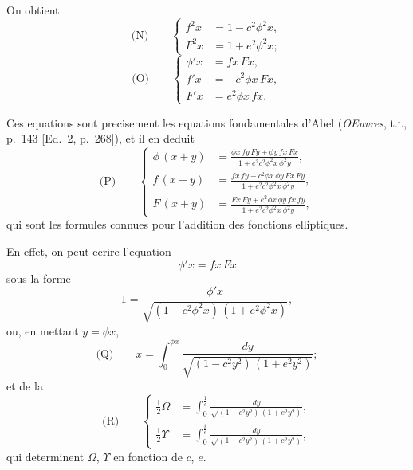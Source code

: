 \documentclass[11pt,a4paper]{book}
\begin{document}
On obtient
\begin{equation*}
\text{(N)}\qquad
\left\{
\begin{aligned}
f^2x &= 1 - c^2 \phi^2 x,\\
F^2x &= 1 + e^2 \phi^2 x;
\end{aligned}
\right.
\end{equation*}
\begin{equation*}
\text{(O)}\qquad
\left\{
\begin{aligned}
\phi' x &= fx\, Fx,\\
f' x &= -c^2 \phi x\, Fx,\\
F' x &= e^2 \phi x\, fx.
\end{aligned}
\right.
\end{equation*}

Ces equations sont precisement les equations fondamentales d'Abel (\textit{OEuvres}, t.\textsc{i}., p.~143
[Ed.~2, p.~268]), et il en deduit
\begin{equation*}
\text{(P)}\qquad
\left\{
\begin{aligned}
\phi\, (x+y) &= \frac{\phi x\, fy\, Fy + \phi y\, fx\, Fx}{1 + e^2 c^2 \phi^2 x\, \phi^2 y},\\
f\, (x+y) &= \frac{fx\, fy - c^2 \phi x\, \phi y\, Fx\, Fy}{1 + e^2 c^2 \phi^2 x\, \phi^2 y},\\
F\, (x+y) &= \frac{Fx\, Fy + e^2 \phi x\, \phi y\, fx\, fy}{1 + e^2 c^2 \phi^2 x\, \phi^2 y},
\end{aligned}
\right.
\end{equation*}
qui sont les formules connues pour l'addition des fonctions elliptiques.

En effet, on peut ecrire l'equation
\[\phi' x = fx\, Fx\]
sous la forme
\[1 = \frac{\phi' x}{\sqrt{(1 - c^2 \phi^2 x)\, (1 + e^2 \phi^2 x)}},\]
ou, en mettant $y = \phi x$,
\begin{equation*}
\text{(Q)}\qquad x = \int_0^{\phi x} \frac{dy}{\sqrt{(1 - c^2 y^2)\, (1 + e^2 y^2)}};
\end{equation*}
et de la
\begin{equation*}
\text{(R)}\qquad
\left\{
\begin{aligned}
\tfrac{1}{2}\Omega &= \int_0^{\frac{1}{c}} \frac{dy}{\sqrt{(1 - c^2 y^2)\, (1 + e^2 y^2)}},\\
\tfrac{1}{2}\Upsilon &= \int_0^{\frac{i}{e}} \frac{dy}{\sqrt{(1 - c^2 y^2)\, (1 + e^2 y^2)}},
\end{aligned}
\right.
\end{equation*}
qui determinent $\Omega$, $\Upsilon$ en fonction de $c$, $e$.
\end{document}

